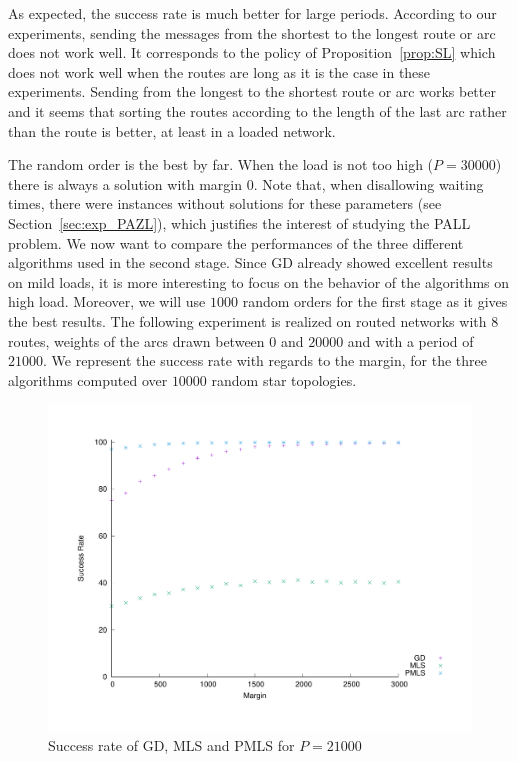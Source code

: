 \documentclass[a4paper,10pt]{article}
\begin{document}
{\begin{figure}[H]
\begin{minipage}[c]{6cm}
            \end{minipage} \hfill
                  \label{fig:success30000}
     \end{figure}
     
     As expected, the  success rate is much better for large periods. According to our experiments, sending the messages from the shortest to the longest route or arc does not work well. It corresponds to the policy of Proposition~\ref{prop:SL} which does not work well when the routes are long as it is the case in these experiments. Sending from the longest to the shortest route or arc works better and it seems that sorting the routes according to the length of the last arc rather than the route is better, at least in a loaded network. 
     
     The random order is the best by far. When the load is not too high ($P = 30000$) there is always a solution with margin $0$.
     Note that, when disallowing waiting times, there were instances without solutions for these parameters (see Section~\ref{sec:exp_PAZL}), which justifies the interest of studying the PALL problem. We now want to compare the performances of the three different algorithms used in the second stage. Since GD already showed excellent results on mild loads, it is more interesting to focus on the behavior of the algorithms on high load. Moreover, we will use $1000$ random orders for the first stage as it gives the best results. The following experiment is realized on routed networks with $8$ routes, weights of the arcs drawn between $0$ and $20000$ and with a period of $21000$.  We represent the success rate with regards to the margin, for the three algorithms computed over $10000$ random star topologies. 
   

 
    \begin{figure} [H] 
       \begin{center}
      \includegraphics[scale=0.45]{retour_21000.pdf}
      \end{center}
      \caption{Success rate of GD, MLS and PMLS for $P = 21000$}
     \label{fig:success21000}
     \end{figure}
     
}
\end{document}
